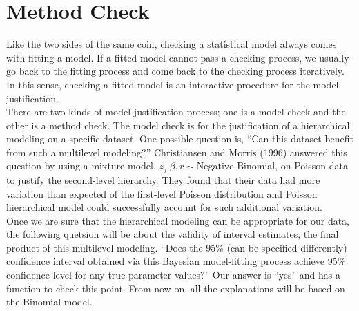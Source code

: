 \documentclass[article]{jss}
\begin{document}
\section[Method Check]{Method Check}
Like the two sides of the same coin, checking a statistical model always comes with fitting a model. If a fitted model cannot pass a checking process, we usually go back to the fitting process and come back to the checking process iteratively. In this sense, checking a fitted model is an interactive procedure for the model justification.
\\

There are two kinds of model justification process; one is a model check and the other is a method check. The model check is for the justification of a hierarchical modeling on a specific dataset. One possible question is, ``Can this dataset benefit from such a multilevel modeling?'' Christiansen and Morris (1996) answered this question by using a mixture model, $z_{j}\vert \beta, r\sim\textrm{Negative-Binomial}$, on Poisson data to justify the second-level hierarchy. They found that their data had more variation than expected of the first-level Poisson distribution and Poisson hierarchical model could successfully account for such additional variation.
\\

Once we are sure that the hierarchical modeling can be appropriate for our data, the following quetsion will be about the validity of interval estimates, the final product of this multilevel modeling. ``Does the 95\% (can be specified differently) confidence interval obtained via this Bayesian model-fitting process achieve 95\% confidence level  for any true parameter values?'' Our answer is ``yes'' and  has a function to check this point. From now on, all the explanations will be based on the Binomial model.
\end{document}
